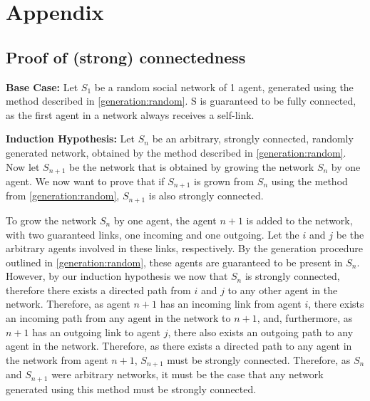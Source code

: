 \documentclass{article}
\begin{document}
\newpage
\section{Appendix}
\subsection{Proof of (strong) connectedness}

\textbf{Base Case:} \newline
Let $S_1$ be a random social network of 1 agent, generated using the method described in \ref{generation:random}.
S is guaranteed to be fully connected, as the first agent in a network always receives a self-link.\newline

\textbf{Induction Hypothesis:}\newline
Let $S_n$ be an arbitrary, strongly connected, randomly generated network, obtained by the method described in \ref{generation:random}. Now let $S_{n+1}$ be the network that is obtained by growing the network $S_n$ by one agent. We now want to prove that if $S_{n+1}$ is grown from $S_n$ using the method from \ref{generation:random}, $S_{n+1}$ is also strongly connected.\newline

To grow the network $S_n$ by one agent, the agent $n+1$ is added to the network, with two guaranteed links, one incoming and one outgoing. Let the $i$ and $j$ be the arbitrary agents involved in these links, respectively. By the generation procedure outlined in \ref{generation:random}, these agents are guaranteed to be present in $S_n$. However, by our induction hypothesis we now that $S_n$ is strongly connected, therefore there exists a directed path from $i$ and $j$ to any other agent in the network. Therefore, as agent $n+1$ has an incoming link from agent $i$, there exists an incoming path from any agent in the network to $n+1$, and, furthermore, as $n+1$ has an outgoing link to agent $j$, there also exists an outgoing path to any agent in the network. Therefore, as there exists a directed path to any agent in the network from agent $n+1$, $S_{n+1}$ must be strongly connected.\newline
Therefore, as $S_n$ and $S_{n+1}$ were arbitrary networks, it must be the case that any network generated using this method must be strongly connected.\newline




\newpage
\end{document}
